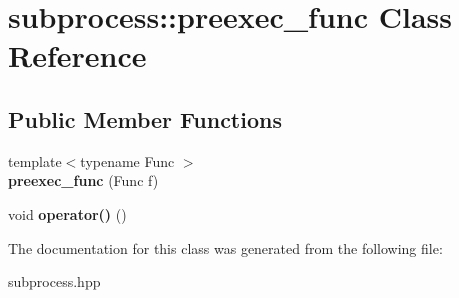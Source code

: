 \hypertarget{classsubprocess_1_1preexec__func}{}\section{subprocess\+:\+:preexec\+\_\+func Class Reference}
\label{classsubprocess_1_1preexec__func}
\subsection*{Public Member Functions}
\begin{DoxyCompactItemize}
\item 
\mbox{\label{classsubprocess_1_1preexec__func_a286f68bbf6643f94c7005e4a74891629}} 
{\footnotesize template$<$typename Func $>$ }\\{\bfseries preexec\+\_\+func} (Func f)
\item 
\mbox{\label{classsubprocess_1_1preexec__func_a06bb2e5927a08b9f2c94fdbbd02ac99a}} 
void {\bfseries operator()} ()
\end{DoxyCompactItemize}


The documentation for this class was generated from the following file\+:\begin{DoxyCompactItemize}
\item 
subprocess.\+hpp\end{DoxyCompactItemize}
